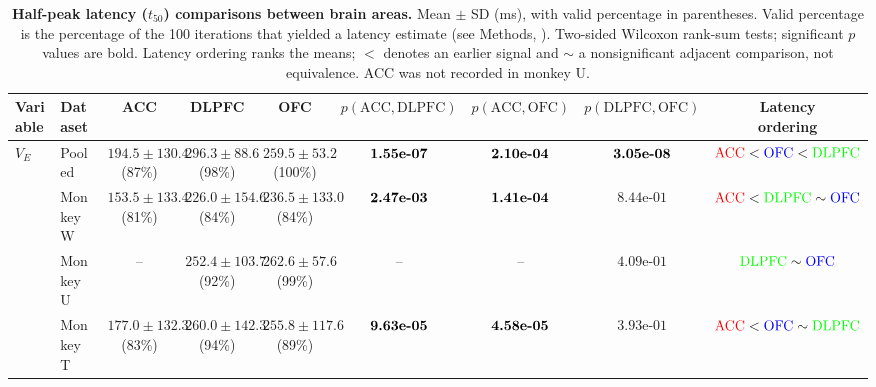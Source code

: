 \documentclass[pdflatex,sn-mathphys-num]{sn-jnl}%
\begin{document}
\clearpage
\begin{table}[p]\centering
\caption{\textbf{Half-peak latency ($t_{50}$) comparisons between brain areas.} Mean $\pm$ SD (ms), with valid percentage in parentheses. Valid percentage is the percentage of the 100 iterations that yielded a latency estimate (see Methods, ). Two-sided Wilcoxon rank-sum tests; significant $p$ values are bold. Latency ordering ranks the means; $<$ denotes an earlier signal and $\sim$ a nonsignificant adjacent comparison, not equivalence. ACC was not recorded in monkey U.}
\label{tab:supp_latency_by_variable}
\begingroup\fontsize{6.5}{8}\selectfont\setlength{\tabcolsep}{1pt}
\begin{tabular*}{\textwidth}{@{\extracolsep{\fill}}llccccccc@{}}\toprule
Variable & Dataset & ACC & DLPFC & OFC & $p(\mathrm{ACC},\mathrm{DLPFC})$ & $p(\mathrm{ACC},\mathrm{OFC})$ & $p(\mathrm{DLPFC},\mathrm{OFC})$ & \shortstack{Latency\\ordering}\\\midrule
$V_E$ & Pooled & \shortstack[c]{$194.5 \pm  130.4$\\(87\%)} & \shortstack[c]{$296.3 \pm  88.6$\\(98\%)} & \shortstack[c]{$259.5 \pm  53.2$\\(100\%)} & $\text{\bfseries \mbox{1.55e-07}}$ & $\text{\bfseries \mbox{2.10e-04}}$ & $\text{\bfseries \mbox{3.05e-08}}$ & $\textcolor{red}{\mathrm{ACC}} < \textcolor{blue}{\mathrm{OFC}} < \textcolor{green}{\mathrm{DLPFC}}$ \\[2pt]
  & Monkey W & \shortstack[c]{$153.5 \pm  133.4$\\(81\%)} & \shortstack[c]{$226.0 \pm  154.6$\\(84\%)} & \shortstack[c]{$236.5 \pm  133.0$\\(84\%)} & $\text{\bfseries \mbox{2.47e-03}}$ & $\text{\bfseries \mbox{1.41e-04}}$ & $\mbox{8.44e-01}$ & $\textcolor{red}{\mathrm{ACC}} < \textcolor{green}{\mathrm{DLPFC}} \sim \textcolor{blue}{\mathrm{OFC}}$ \\[2pt]
  & Monkey U & -- & \shortstack[c]{$252.4 \pm  103.7$\\(92\%)} & \shortstack[c]{$262.6 \pm  57.6$\\(99\%)} & -- & -- & $\mbox{4.09e-01}$ & $\textcolor{green}{\mathrm{DLPFC}} \sim \textcolor{blue}{\mathrm{OFC}}$ \\[2pt]
  & Monkey T & \shortstack[c]{$177.0 \pm  132.3$\\(83\%)} & \shortstack[c]{$260.0 \pm  142.3$\\(94\%)} & \shortstack[c]{$255.8 \pm  117.6$\\(89\%)} & $\text{\bfseries \mbox{9.63e-05}}$ & $\text{\bfseries \mbox{4.58e-05}}$ & $\mbox{3.93e-01}$ & $\textcolor{red}{\mathrm{ACC}} < \textcolor{blue}{\mathrm{OFC}} \sim \textcolor{green}{\mathrm{DLPFC}}$ \\[2pt]

\end{tabular*}
\end{table}
\end{document}
